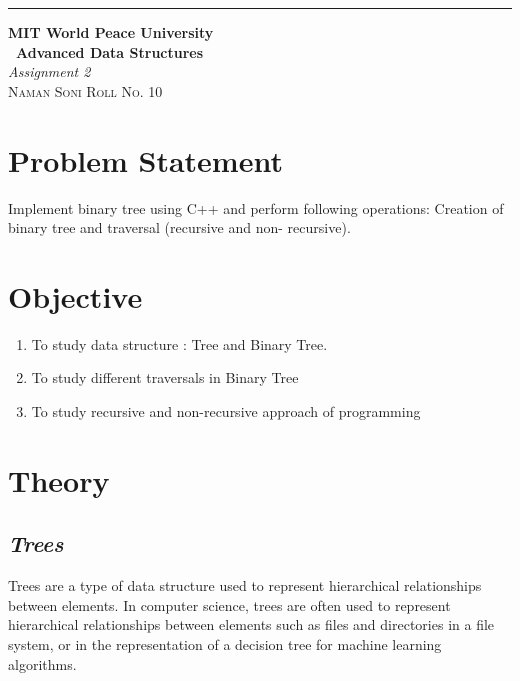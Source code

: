 \documentclass{article}
\begin{document}
	\begin{titlepage} %
		
		\raggedleft\rule{1pt}{\textheight} %
		\hspace{0.05\textwidth} %
		\parbox[b]{0.75\textwidth}
		{ %
			
			{\Huge\bfseries MIT World Peace University \\[0.5\baselineskip] \ Advanced Data Structures}\\[2\baselineskip] %
			{\large\textit{Assignment 2}}\\[4\baselineskip] %
			{\Large\textsc{Naman Soni Roll No. 10}} %
			
			\vspace{0.5\textheight} %
		}
		
	\end{titlepage}
	\tableofcontents
	\pagebreak
\section{\textbf{Problem Statement}}
Implement binary tree using C++ and perform following operations: Creation of binary tree and traversal (recursive and non- recursive).
\section{\textbf{Objective}}
	\begin{enumerate}
		\item To study data structure : Tree and Binary Tree.
		\item To study different traversals in Binary Tree
		\item To study recursive and non-recursive approach of programming
	\end{enumerate}
\section{\textbf{Theory}}
\subsection{\textit{Trees}}
Trees are a type of data structure used to represent hierarchical relationships between elements. In computer science, trees are often used to represent hierarchical relationships between elements such as files and directories in a file system, or in the representation of a decision tree for machine learning algorithms.\\
\end{document}
